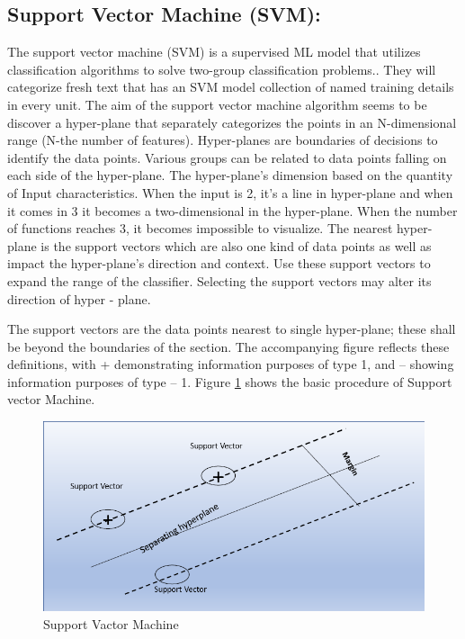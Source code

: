 \subsection{Support Vector Machine (SVM):} The support vector machine (SVM) is a supervised ML
model that utilizes classification algorithms to solve two-group classification problems.. They will categorize fresh text that has an SVM model collection of named training details in every unit. The aim of the support vector machine algorithm seems to be discover a hyper-plane that separately categorizes the points in an N-dimensional range (N-the number of features). Hyper-planes are boundaries of decisions to identify the data points. Various groups can be related to data points falling on each side of the hyper-plane. The hyper-plane's dimension based on the quantity of Input characteristics. When the input is 2, it’s a line in hyper-plane and when it comes in 3 it becomes a two-dimensional in the hyper-plane. When the number of functions reaches 3, it becomes impossible to visualize.  The nearest hyper-plane is the support vectors which are also one kind of data points as well as impact the hyper-plane's direction and context. Use these support vectors to expand the range of the classifier. Selecting the support vectors may alter its direction of hyper - plane.

\vspace{0.5cm}
The support vectors are the data points nearest to single hyper-plane; these shall be beyond the boundaries of the section. The accompanying figure reflects these definitions, with + demonstrating information purposes of type 1, and – showing information purposes of type – 1. Figure \ref{fig:SVM} shows the basic procedure of Support vector Machine.

\begin{figure}[!ht]
    \centering
    \includegraphics[scale=0.7]{Chap3/SVM.PNG}
    \caption{Support Vactor Machine}
    \label{fig:SVM}
\end{figure}

